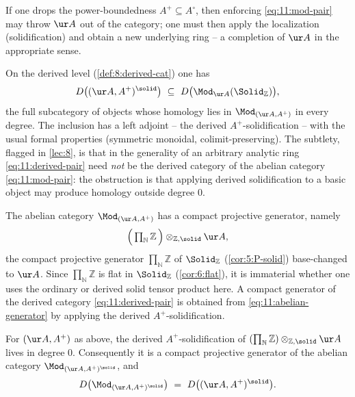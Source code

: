 \begin{remark}
\label{rmk:11:completion-aside}
If one drops the power-boundedness $A^{+}\subseteq A^{\circ}$, then enforcing
\eqref{eq:11:mod-pair} may throw $\ur A$ out of the category; one must then apply
the localization (solidification) and obtain a new underlying ring -- a
completion of $\ur A$ in the appropriate sense.
\end{remark}

On the derived level (\cref{def:8:derived-cat}) one has
\begin{equation}
\label{eq:11:derived-pair}
D\bigl((\ur A,A^{+})^{\solid}\bigr)\ \subseteq\ D\bigl(\Mod_{\ur A}(\Solid_{
\mathbb{Z}})\bigr),
\end{equation}
the full subcategory of objects whose homology lies in $\Mod_{(\ur A,A^{+})}$ in
every degree. The inclusion has a left adjoint -- the derived
$A^{+}$-solidification -- with the usual formal properties (symmetric
monoidal, colimit-preserving). The subtlety, flagged in \cref{lec:8}, is that
in the generality of an arbitrary analytic ring \eqref{eq:11:derived-pair} need
\emph{not} be the derived category of the abelian category
\eqref{eq:11:mod-pair}: the obstruction is that applying derived solidification
to a basic object may produce homology outside degree $0$.

The abelian category $\Mod_{(\ur A,A^{+})}$ has a compact projective generator,
namely
\begin{equation}
\label{eq:11:abelian-generator}
\Bigl(\,\textstyle\prod_{\mathbb{N}}\mathbb{Z}\,\Bigr)\otimes_{\mathbb{Z},\solid}
\ur A,
\end{equation}
the compact projective generator $\prod_{\mathbb{N}}\mathbb{Z}$ of
$\Solid_{\mathbb{Z}}$ (\cref{cor:5:P-solid}) base-changed to $\ur A$. Since
$\prod_{\mathbb{N}}\mathbb{Z}$ is flat in $\Solid_{\mathbb{Z}}$
(\cref{cor:6:flat}), it is immaterial whether one uses the ordinary or derived
solid tensor product here. A compact generator of the derived category
\eqref{eq:11:derived-pair} is obtained from \eqref{eq:11:abelian-generator} by
applying the derived $A^{+}$-solidification.

\begin{theorem}
\label{thm:11:degree-zero}
For $(\ur A,A^{+})$ as above, the derived $A^{+}$-solidification of
$(\prod_{\mathbb{N}}\mathbb{Z})\otimes_{\mathbb{Z},\solid}\ur A$ lives in degree
$0$. Consequently it is a compact projective generator of the abelian category
$\Mod_{(\ur A,A^{+})^{\solid}}$, and
\begin{equation}
\label{eq:11:D-equals-Dheart}
D\bigl(\Mod_{(\ur A,A^{+})^{\solid}}\bigr)\ =\ D\bigl((\ur A,A^{+})^{\solid}
\bigr).
\end{equation}
\end{theorem}

